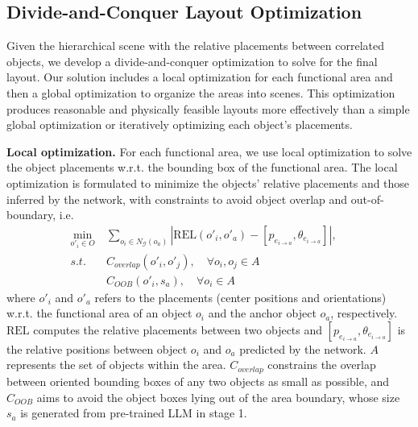 \subsection{Divide-and-Conquer Layout Optimization} 

Given the hierarchical scene with the relative placements between correlated objects, we develop a divide-and-conquer optimization to solve for the final layout. Our solution includes a local optimization for each functional area and then a global optimization to organize the areas into scenes. This optimization produces reasonable and physically feasible layouts more effectively than a simple global optimization or iteratively optimizing each object's placements.



\noindent \textbf{Local optimization.} For each functional area, we use local optimization to solve the object placements w.r.t. the bounding box of the functional area. The local optimization is formulated to minimize the objects' relative placements and those inferred by the network, with constraints to avoid object overlap and out-of-boundary, i.e.
\begin{equation}
\begin{aligned}
\min_{o'_i\in O} &  \sum_{o_i\in N_\mathcal{G}(o_a)} |\mathrm{REL}(o'_i, o'_a)-[p_{e_{i\xrightarrow{} a}},\theta_{e_{i\xrightarrow{} a}}]|, \quad \\
s.t. \quad & C_{overlap}(o'_i, o'_j), \quad \forall o_i,o_j \in A \\
& C_{OOB}(o'_i, s_a), \quad \forall o_i \in A 
\end{aligned}
\end{equation}
where $o'_i$ and $o'_a$ refers to the placements (center positions and orientations) w.r.t. the functional area of an object $o_i$ and the anchor object $o_a$, respectively. $\mathrm{REL}$ computes the relative placements between two objects and $[p_{e_{i\xrightarrow{} a}},\theta_{e_{i\xrightarrow{} a}}]$ is the relative positions between object $o_i$ and $o_a$ predicted by the network. $A$ represents the set of objects within the area. $C_{overlap}$ constrains the overlap between oriented bounding boxes of any two objects as small as possible, and $C_{OOB}$ aims to avoid the object boxes lying out of the area boundary, whose size $s_a$ is generated from pre-trained LLM in stage 1.


